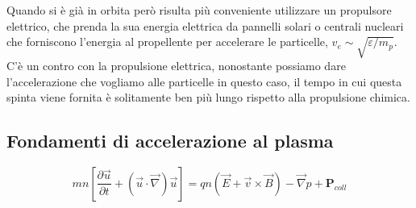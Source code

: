 \documentclass{book}
\begin{document}
Quando si è già in orbita però risulta più conveniente utilizzare un propulsore elettrico, che prenda la sua energia elettrica da pannelli solari o centrali nucleari che forniscono l'energia al propellente per accelerare le particelle, $v_e\sim \sqrt{\varepsilon/m_p}$.
C'è un contro con la propulsione elettrica, nonostante possiamo dare l'accelerazione che vogliamo alle particelle in questo caso, il tempo in cui questa spinta viene fornita è solitamente ben più lungo rispetto alla propulsione chimica.

\subsection{Fondamenti di accelerazione al plasma}

\begin{equation}
    mn\left[ \frac{\partial \vec u}{\partial t} + (\vec u\cdot \vec \nabla)\vec u\right] = qn (\vec E + \vec v\times \vec B)-\vec\nabla p + \textbf{P}_{coll}
\end{equation}
\end{document}
